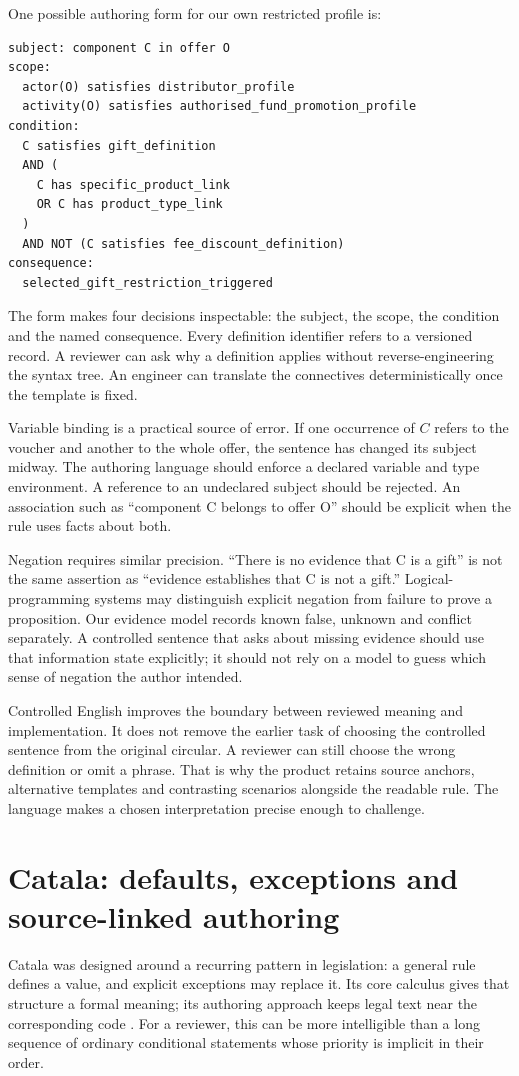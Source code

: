 \documentclass[12pt,a4paper,oneside,openany]{book}
\begin{document}
One possible authoring form for our own restricted profile is:
\begin{lstlisting}[caption={Illustrative LegalMath authoring notation. This is a proposed template, not claimed to be valid Logical English or Catala source.}]
subject: component C in offer O
scope:
  actor(O) satisfies distributor_profile
  activity(O) satisfies authorised_fund_promotion_profile
condition:
  C satisfies gift_definition
  AND (
    C has specific_product_link
    OR C has product_type_link
  )
  AND NOT (C satisfies fee_discount_definition)
consequence:
  selected_gift_restriction_triggered
\end{lstlisting}
The form makes four decisions inspectable: the subject, the scope, the
condition and the named consequence. Every definition identifier refers to
a versioned record. A reviewer can ask why a definition applies without
reverse-engineering the syntax tree. An engineer can translate the connectives
deterministically once the template is fixed.

Variable binding is a practical source of error. If one occurrence of $C$
refers to the voucher and another to the whole offer, the sentence has changed
its subject midway. The authoring language should enforce a declared variable
and type environment. A reference to an undeclared subject should be rejected.
An association such as ``component C belongs to offer O'' should be explicit
when the rule uses facts about both.

Negation requires similar precision. ``There is no evidence that C is a gift''
is not the same assertion as ``evidence establishes that C is not a gift.''
Logical-programming systems may distinguish explicit negation from failure to
prove a proposition. Our evidence model records known false, unknown and
conflict separately. A controlled sentence that asks about missing evidence
should use that information state explicitly; it should not rely on a model
to guess which sense of negation the author intended.

Controlled English improves the boundary between reviewed meaning and
implementation. It does not remove the earlier task of choosing the controlled
sentence from the original circular. A reviewer can still choose the wrong
definition or omit a phrase. That is why the product retains source anchors,
alternative templates and contrasting scenarios alongside the readable rule.
The language makes a chosen interpretation precise enough to challenge.

\section{Catala: defaults, exceptions and source-linked authoring}
\label{sec:languages-catala}
Catala was designed around a recurring pattern in legislation: a general rule
defines a value, and explicit exceptions may replace it. Its core calculus
gives that structure a formal meaning; its authoring approach keeps legal text
near the corresponding code \citep[secs.~2--4]{catala2021}. For a reviewer,
this can be more intelligible than a long sequence of ordinary conditional
statements whose priority is implicit in their order.
\end{document}
